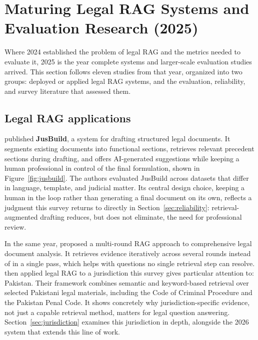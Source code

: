 \section{Maturing Legal RAG Systems and Evaluation Research (2025)}
\label{sec:maturing}

Where 2024 established the problem of legal RAG and the metrics needed to evaluate it, 2025 is the
year complete systems and larger-scale evaluation studies arrived. This section follows eleven
studies from that year, organized into two groups: deployed or applied legal RAG systems, and the
evaluation, reliability, and survey literature that assessed them.

\subsection{Legal RAG applications}

\citet{buffa2025} published \textbf{JusBuild}, a system for drafting structured legal documents. It
segments existing documents into functional sections, retrieves relevant precedent sections during
drafting, and offers AI-generated suggestions while keeping a human professional in control of the
final formulation, shown in Figure~\ref{fig:jusbuild}. The authors evaluated JusBuild across datasets
that differ in language, template, and judicial matter. Its central design choice, keeping a human
in the loop rather than generating a final document on its own, reflects a judgment this survey
returns to directly in Section~\ref{sec:reliability}: retrieval-augmented drafting reduces, but does
not eliminate, the need for professional review.



In the same year, \citet{zhang2025} proposed a multi-round RAG approach to comprehensive legal
document analysis. It retrieves evidence iteratively across several rounds instead of in a single
pass, which helps with questions no single retrieval step can resolve. \citet{ref312025} then
applied legal RAG to a jurisdiction this survey gives particular attention to: Pakistan. Their
framework combines semantic and keyword-based retrieval over selected Pakistani legal materials,
including the Code of Criminal Procedure and the Pakistan Penal Code. It shows concretely why
jurisdiction-specific evidence, not just a capable retrieval method, matters for legal question
answering. Section~\ref{sec:jurisdiction} examines this jurisdiction in depth, alongside the 2026
system that extends this line of work.

